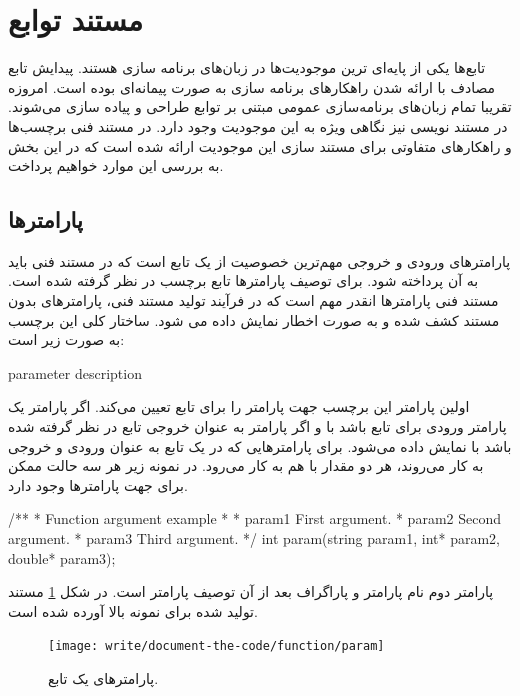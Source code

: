 

\section{مستند توابع}

تابع‌ها یکی از پایه‌ای ترین موجودیت‌ها در زبان‌های برنامه سازی هستند.
پیدایش تابع مصادف با ارائه شدن راهکارهای برنامه سازی به صورت پیمانه‌ای بوده است.
امروزه تقریبا تمام زبان‌های برنامه‌سازی عمومی مبتنی بر توابع طراحی و پیاده سازی
می‌شوند.
در مستند نویسی نیز نگاهی ویژه به این موجودیت وجود دارد.
در مستند فنی برچسب‌ها و راهکارهای متفاوتی برای مستند سازی این موجودیت ارائه شده
است که در این بخش به بررسی این موارد خواهیم پرداخت.

\subsection{پارامترها}

پارامترهای ورودی و خروجی مهم‌ترین خصوصیت از یک تابع است که در مستند فنی باید به آن پرداخته شود.
برای توصیف پارامترها تابع برچسب  در نظر گرفته شده است.
مستند فنی پارامترها انقدر مهم است که در فرآیند تولید مستند فنی، پارامترهای بدون مستند کشف شده و 
به صورت اخطار نمایش داده می شود.
ساختار کلی این برچسب به صورت زیر است:
\begin{C++}
 { parameter description }
\end{C++}

اولین پارامتر این برچسب جهت پارامتر را برای تابع تعیین می‌کند.
اگر پارامتر یک پارامتر ورودی برای تابع باشد با  و اگر پارامتر
به عنوان خروجی تابع در نظر گرفته شده باشد با  نمایش داده می‌شود.
برای پارامترهایی که در یک تابع به عنوان ورودی و خروجی به کار می‌روند، هر دو مقدار 
با هم به کار می‌رود.
در نمونه زیر هر سه حالت ممکن برای جهت پارامترها وجود دارد. 
\begin{C++}
/**
 * \brief Function argument example
 *
 * \param[in]      param1 First argument.
 * \param[out]      param2 Second argument.
 * \param[in,out] param3 Third argument.
 */
int param(string param1, int* param2, double* param3);
\end{C++}

پارامتر دوم نام پارامتر و پاراگراف بعد از آن توصیف پارامتر است. در شکل
\ref{write/document-the-code/function/param} مستند تولید شده برای نمونه
بالا آورده شده است.
\begin{figure}
	\centering
	\texttt{[image: write/document-the-code/function/param]}
	\caption[پارامترهای یک تابع]{
		پارامترهای یک تابع.
	}
	\label{write/document-the-code/function/param}
\end{figure}

